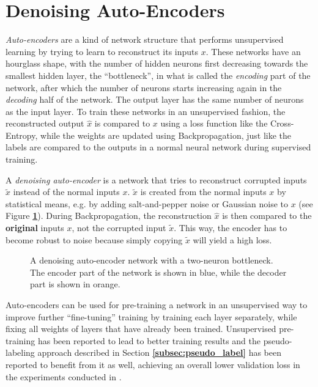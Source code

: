 	\section{Denoising Auto-Encoders}

\textit{Auto-encoders} are a kind of network structure that performs unsupervised learning by trying to learn to reconstruct its inputs $x$. These networks have an hourglass shape, with the number of hidden neurons first decreasing towards the smallest hidden layer, the ``bottleneck'', in what is called the \textit{encoding} part of the network, after which the number of neurons starts increasing again in the \textit{decoding} half of the network. The output layer has the same number of neurons as the input layer. To train these networks in an unsupervised fashion, the reconstructed output $\hat{x}$ is compared to $x$ using a loss function like the Cross-Entropy, while the weights are updated using Backpropagation, just like the labels are compared to the outputs in a normal neural network during supervised training.

A \textit{denoising auto-encoder} is a network that tries to reconstruct corrupted inputs $\widetilde{x}$ instead of the normal inputs $x$. $\widetilde{x}$ is created from the normal inputs $x$ by statistical means, e.g. by adding salt-and-pepper noise or Gaussian noise to $x$ (see Figure \textbf{\ref{fig:auto_encoder}}). During Backpropagation, the reconstruction $\hat{x}$ is then compared to the \textbf{original} inputs $x$, not the corrupted input $\widetilde{x}$. This way, the encoder has to become robust to noise because simply copying $\widetilde{x}$ will yield a high loss. \cite{autoencoder, denoising_autoencoder}\\

\begin {figure}[!htb]
	\begin{center}
		\scalebox{0.70}{}
	\end{center}

		\caption[A denoising auto-encoder.]{A denoising auto-encoder network with a two-neuron bottleneck. The encoder part of the network is shown in blue, while the decoder part is shown in orange.}
		\label{fig:auto_encoder}
\end {figure}

Auto-encoders can be used for pre-training a network in an unsupervised way to improve further ``fine-tuning'' training by training each layer separately, while fixing all weights of layers that have already been trained. Unsupervised pre-training has been reported to lead to better training results \cite{pretraining} and the pseudo-labeling approach described in Section \textbf{\ref{subsec:pseudo_label}} has been reported to benefit from it as well, achieving an overall lower validation loss in the experiments conducted in \cite{pseudo_label}.


